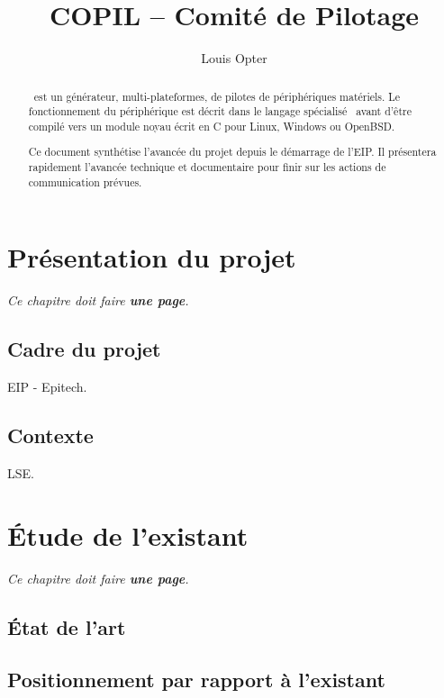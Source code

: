 \documentclass[francais]{rtxreport}
\author{Louis Opter} \title{COPIL -- Comité de Pilotage}
\begin{document}
\maketitle

\begin{abstract}
\rtx\ est un générateur, multi-plateformes, de pilotes de périphériques
matériels. Le fonctionnement du périphérique est décrit dans le langage
spécialisé \rtx\ avant d'être compilé vers un module noyau écrit en C pour
Linux, Windows ou OpenBSD.

Ce document synthétise l'avancée du projet depuis le démarrage de l'EIP. Il
présentera rapidement l’avancée technique et documentaire pour finir sur les
actions de communication prévues.
\end{abstract}

\rtxmaketitleblock

\tableofcontents

\chapter{Présentation du projet}

\emph{Ce chapitre doit faire \textbf{une page}.}

\section{Cadre du projet}

EIP - Epitech.

\section{Contexte}

LSE.

\chapter{Étude de l'existant}

\emph{Ce chapitre doit faire \textbf{une page}.}

\section{État de l'art}

\section{Positionnement par rapport à l'existant}
\end{document}
